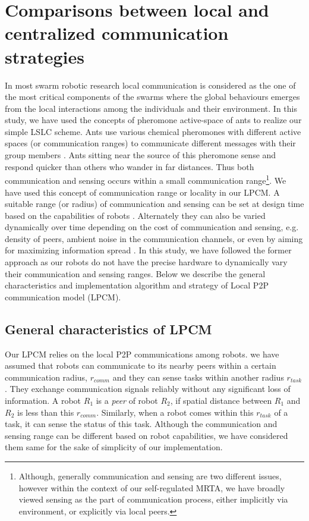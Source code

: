 \documentclass{intech}
\begin{document}
\section{Comparisons between local and centralized communication strategies}
In most swarm robotic research local communication is considered as the one of the most critical components of the swarms where the global behaviours emerges from the local interactions among the individuals and their environment. In this study, we have used the concepts of pheromone active-space of ants to realize our simple LSLC scheme. Ants use various chemical pheromones with different active spaces (or communication ranges) to communicate different messages with their group members \cite{Holldobler1990}. Ants sitting near the source of this pheromone sense and respond quicker than others who wander in far distances. Thus both communication and sensing occurs within a small communication range\footnote{Although, generally communication and sensing are two different issues, however within the context of our self-regulated MRTA, we have broadly viewed sensing as the part of communication process, either implicitly via environment, or explicitly via local peers.}. We have used this concept of communication range or locality in our LPCM. A suitable  range (or radius) of communication and sensing can be set at design time based on the capabilities of robots \cite{Agassounon+2002}. Alternately they can also be varied dynamically over time depending on the  cost of communication and sensing, e.g. density of peers, ambient noise in the communication channels, or even by aiming for maximizing information spread  \cite{Yoshida+2000}. In this study, we have followed the former approach as our robots do not have the precise hardware to dynamically vary their communication and sensing ranges. Below we describe the general characteristics and implementation algorithm and strategy of Local P2P communication model (LPCM).
\subsection{General characteristics of LPCM}
Our LPCM relies on the local P2P communications among robots. we have assumed that robots can communicate to its nearby peers within a certain communication radius, $r_{comm}$ and they can sense tasks within another radius $r_{task}$. They exchange communication signals reliably without any significant loss of information. A robot $R_1$ is a {\em peer} of robot $R_2$, if spatial distance between $R_1$ and $R_2$ is less than this $r_{comm}$.
Similarly, when a robot comes within this $r_{task}$ of a task, it can sense the status of this task. Although the communication and sensing  range can be different based on robot capabilities, we have considered them same for the sake of simplicity of our implementation.
\end{document}
